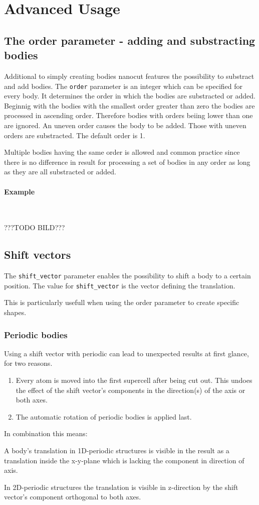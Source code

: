 \section{Advanced Usage}
\subsection{The order parameter - adding and substracting bodies}
Additional to simply creating bodies nanocut features the possibility to substract and add bodies.
The \lstinline{order} parameter is an integer which can be specified for every body. It determines the order in which the bodies are substracted or added. Beginnig with the bodies with the smallest order greater than zero the bodies are processed in ascending order. Therefore bodies with orders beiing lower than one are ignored.
An uneven order causes the body to be added. Those with uneven orders are substracted. The default order is 1.

Multiple bodies having the same order is allowed and common practice since there is no difference in result for processing a set of bodies in any order as long as they are all substracted or added.

\paragraph{Example}\ 

???TODO BILD???

\subsection{Shift vectors}
The \lstinline{shift_vector} parameter enables the possibility to shift a body to a certain position. The value for \lstinline{shift_vector} is the vector defining the translation.

This is particularly usefull when using the order parameter to create specific shapes.

\subsubsection{Periodic bodies}

Using a shift vector with periodic can lead to unexpected results at first glance, for two reasons. 
\begin{enumerate}
 \item Every atom is moved into the first supercell after being cut out. This undoes the effect of the shift vector's components in the direction(s) of the axis or both axes.
 \item The automatic rotation of periodic bodies is applied last.
\end{enumerate}
In combination this means: 

A body's translation in 1D-periodic structures is visible in the result as a translation inside the x-y-plane which is lacking the component in direction of axis.

In 2D-periodic structures the translation is visible in z-direction by the shift vector's component orthogonal to both axes.